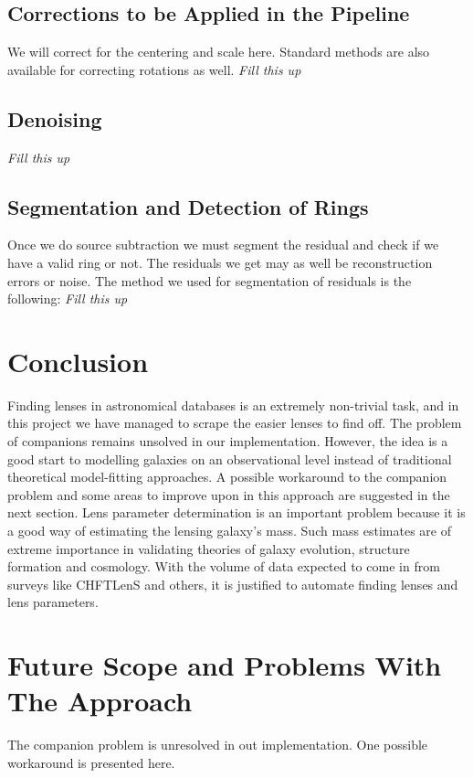 \documentclass[11pt, a4paper]{article}
\begin{document}
\subsection{Corrections to be Applied in the Pipeline}
We will correct for the centering and scale here. Standard methods are also available for correcting rotations as well. \textit{Fill this up}

\subsection{Denoising}
\textit{Fill this up}

\subsection{Segmentation and Detection of Rings}
Once we do source subtraction we must segment the residual and check if we have a valid ring or not. The residuals we get may as well be reconstruction errors or noise.
The method we used for segmentation of residuals is the following: \textit{Fill this up}

\section{Conclusion}
Finding lenses in astronomical databases is an extremely non-trivial task, and in this project we have managed to scrape the easier lenses to find off. The problem of companions remains unsolved in our implementation. However, the idea is a good start to modelling galaxies on an observational level instead of traditional theoretical model-fitting approaches. A possible workaround to the companion problem and some areas to improve upon in this approach are suggested in the next section.
Lens parameter determination is an important problem because it is a good way of estimating the lensing galaxy's mass. Such mass estimates are of extreme importance in validating theories of galaxy evolution, structure formation and cosmology. With the volume of data expected to come in from surveys like CHFTLenS and others, it is justified to automate finding lenses and lens parameters.

\section{Future Scope and Problems With The Approach}
The companion problem is unresolved in out implementation. One possible workaround is presented here.
\end{document}
